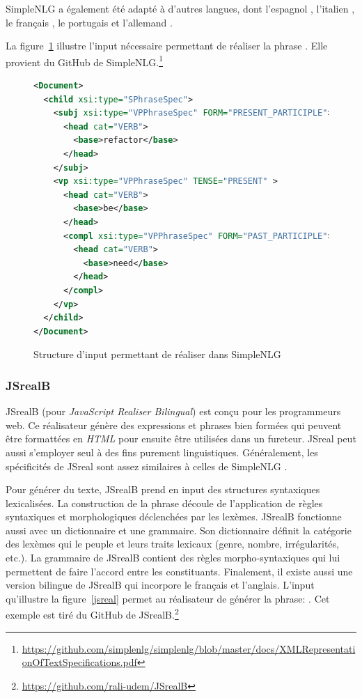 SimpleNLG a également été adapté à d'autres langues, dont l'espagnol \citep{RamosSotoAdaptingSimpleNLGSpanish2017}, l'italien \citep{MazzeiSimpleNLGITadaptingSimpleNLG2016}, le français \citep{VaudryAdaptingSimpleNLGBilingual2013}, le portugais \citep{deOliveiraAdaptingSimpleNLGBrazilian2014} et l'allemand \citep{BollmannAdaptingSimpleNLGGerman2011}.

La figure~\ref{simplenlg} illustre l'input nécessaire permettant de réaliser la phrase . Elle provient du GitHub de SimpleNLG.\footnote{\url{https://github.com/simplenlg/simplenlg/blob/master/docs/XMLRepresentationOfTextSpecifications.pdf}}

\begin{figure}[htb]
 \caption{Structure d'input permettant de réaliser  dans SimpleNLG}
 \label{simplenlg}
\begin{lstlisting}[language=Xml]
<Document>
  <child xsi:type="SPhraseSpec">
    <subj xsi:type="VPPhraseSpec" FORM="PRESENT_PARTICIPLE">
      <head cat="VERB">
        <base>refactor</base>
      </head>
    </subj>
    <vp xsi:type="VPPhraseSpec" TENSE="PRESENT" >
      <head cat="VERB">
        <base>be</base>
      </head>
      <compl xsi:type="VPPhraseSpec" FORM="PAST_PARTICIPLE">
        <head cat="VERB">
          <base>need</base>
        </head>
      </compl>
    </vp>
  </child>
</Document>
\end{lstlisting}
\end{figure}

\subsubsection{JSrealB}
JSrealB (pour \emph{JavaScript Realiser Bilingual}) \citep{DBLP:conf/enlg/MolinsL15} est conçu pour les programmeurs web. Ce réalisateur génère des expressions et phrases bien formées qui peuvent être formattées en \emph{HTML} pour ensuite être utilisées dans un fureteur. JSreal peut aussi s'employer seul à des fins purement linguistiques. Généralement, les spécificités de JSreal sont assez similaires à celles de SimpleNLG \citep{GattSimpleNLGRealisationEngine2009}.

Pour générer du texte, JSrealB prend en input des structures syntaxiques lexicalisées. La construction de la phrase découle de l'application de règles syntaxiques et morphologiques déclenchées par les lexèmes. JSrealB fonctionne aussi avec un dictionnaire et une grammaire. Son dictionnaire définit la catégorie des lexèmes qui le peuple et leurs traits lexicaux (genre, nombre, irrégularités, etc.). La grammaire de JSrealB contient des règles morpho-syntaxiques qui lui permettent de faire l'accord entre les constituants. Finalement, il existe aussi une version bilingue de JSrealB \citep{MolinsJSrealBBilingualText2015} qui incorpore le français et l'anglais. L'input qu'illustre la figure~\ref{jsreal} permet au réalisateur de générer la phrase: . Cet exemple est tiré du GitHub de JSrealB.\footnote{\url{https://github.com/rali-udem/JSrealB}}

